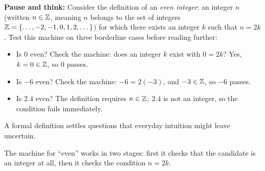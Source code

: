 \begin{recoverybox}
\textbf{Pause and think:} Consider the definition of an \emph{even integer}: an integer $n$ (written $n \in \mathbb{Z}$, meaning $n$ belongs to the set of integers $\mathbb{Z} = \{\dots, -2, -1, 0, 1, 2, \dots\}$) for which there exists an integer $k$ such that $n = 2k$. Test this machine on three borderline cases before reading further:
\begin{itemize}
\item Is $0$ even? Check the machine: does an integer $k$ exist with $0 = 2k$? Yes, $k = 0 \in \mathbb{Z}$, so $0$ passes.
\item Is $-6$ even? Check the machine: $-6 = 2(-3)$, and $-3 \in \mathbb{Z}$, so $-6$ passes.
\item Is $2.4$ even? The definition requires $n \in \mathbb{Z}$; $2.4$ is not an integer, so the condition fails immediately.
\end{itemize}
A formal definition settles questions that everyday intuition might leave uncertain.
\end{recoverybox}

The machine for ``even'' works in two stages: first it checks that the candidate is an integer at all, then it checks the condition $n = 2k$.

